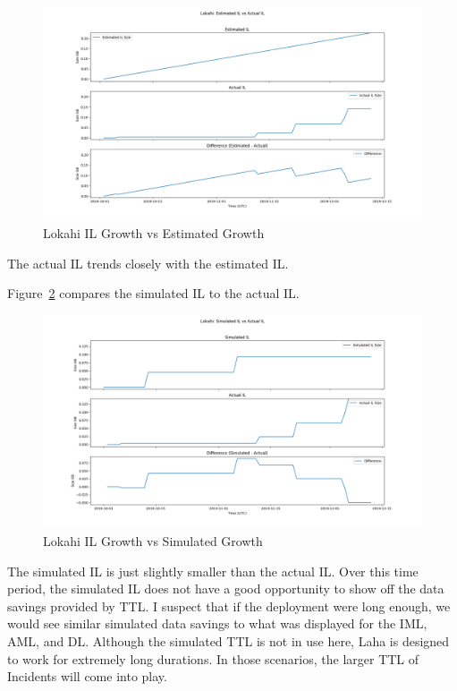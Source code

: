 \begin{figure}[H]
    \centering
    \includegraphics[width=\linewidth]{figures/lokahi_actual_il_vs_est.png}
    \caption{Lokahi IL Growth vs Estimated Growth}
    \label{fig:lokahi_actual_il_vs_est}
\end{figure}

The actual IL trends closely with the estimated IL.

Figure~\ref{fig:lokahi_actual_il_vs_sim} compares the simulated IL to the actual IL.

\begin{figure}[H]
    \centering
    \includegraphics[width=\linewidth]{figures/lokahi_actual_il_vs_sim.png}
    \caption{Lokahi IL Growth vs Simulated Growth}
    \label{fig:lokahi_actual_il_vs_sim}
\end{figure}

The simulated IL is just slightly smaller than the actual IL. Over this time period, the simulated IL does not have a good opportunity to show off the data savings provided by TTL. I suspect that if the deployment were long enough, we would see similar simulated data savings to what was displayed for the IML, AML, and DL. Although the simulated TTL is not in use here, Laha is designed to work for extremely long durations. In those scenarios, the larger TTL of Incidents will come into play.

